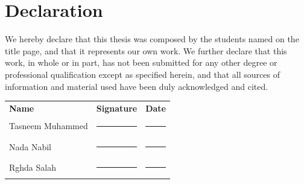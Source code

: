 \chapter*{Declaration}

We hereby declare that this thesis was composed by the students named on the
title page, and that it represents our own work. We further declare that this
work, in whole or in part, has not been submitted for any other degree or
professional qualification except as specified herein, and that all sources of
information and material used have been duly acknowledged and cited.

\vspace{2.0cm}

\noindent
\begin{tabular}{@{}l l l@{}}
\textbf{Name} & \textbf{Signature} & \textbf{Date} \\[6pt]
Tasneem Muhammed & \rule{4.5cm}{0.4pt} & \rule{3cm}{0.4pt} \\[18pt]
Nada Nabil       & \rule{4.5cm}{0.4pt} & \rule{3cm}{0.4pt} \\[18pt]
Rghda Salah      & \rule{4.5cm}{0.4pt} & \rule{3cm}{0.4pt} \\
\end{tabular}

\clearpage
